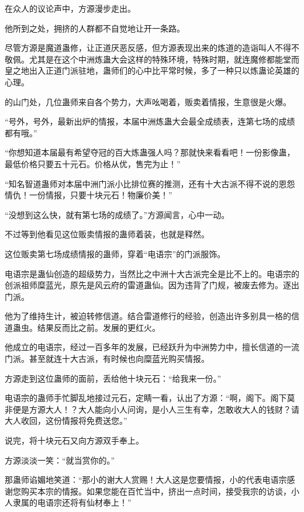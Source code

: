 
\begin{this_body}



在众人的议论声中，方源漫步走出。

他所到之处，拥挤的人群都不自觉地让开一条路。

尽管方源是魔道蛊修，让正道厌恶反感，但方源表现出来的炼道的造诣叫人不得不敬佩。尤其是在这个中洲炼蛊大会这样的特殊环境，特殊时期，就连魔修都能堂而皇之地出入正道门派驻地，蛊师们的心中比平常时候，多了一种只以炼蛊论英雄的心理。

的山门处，几位蛊师来自各个势力，大声吆喝着，贩卖着情报，生意很是火爆。

“号外，号外，最新出炉的情报，本届中洲炼蛊大会最全成绩表，连第七场的成绩都有哦。”

“你想知道本届最有希望夺冠的百大炼蛊强人吗？那就快来看看吧！一份影像蛊，最低价格只要五十元石。价格从优，售完为止！”

“知名智道蛊师对本届中洲门派小比排位赛的推测，还有十大古派不得不说的恩怨情仇！一份情报，只要十块元石！物廉价美！”

“没想到这么快，就有第七场的成绩了。”方源闻言，心中一动。

不过等到他看见这位贩卖情报的蛊师着装，也就是释然。

这位贩卖第七场成绩情报的蛊师，穿着“电语宗”的门派服饰。

电语宗是蛊仙创造的超级势力，当然比之中洲十大古派完全是比不上的。电语宗的创派祖师糜蓝光，原先是风云府的雷道蛊仙。因为违背了门规，被废去修为。逐出门派。

他为了维持生计，被迫转修信道。结合雷道修行的经验，创造出许多别具一格的信道蛊虫。结果反而比之前。发展的更红火。

他成立的电语宗，经过一百多年的发展，已经跃升为中洲势力中，擅长信道的一流门派。甚至就连十大古派，有时候也向糜蓝光购买情报。

方源走到这位蛊师的面前，丢给他十块元石：“给我来一份。”

电语宗的蛊师手忙脚乱地接过元石，定睛一看，认出了方源：“啊，阁下。阁下莫非便是方源大人！？大人能向小人问询，是小人三生有幸，怎敢收大人的钱财？请大人收回，这份情报将免费送您。”

说完，将十块元石又向方源双手奉上。

方源淡淡一笑：“就当赏你的。”

那蛊师谄媚地笑道：“那小的谢大人赏赐！大人这是您要情报，小的代表电语宗感谢您购买本宗的情报。如果您能在百忙当中，挤出一点时间，接受我宗的访谈，小人隶属的电语宗还将有仙材奉上！”


\end{this_body}
